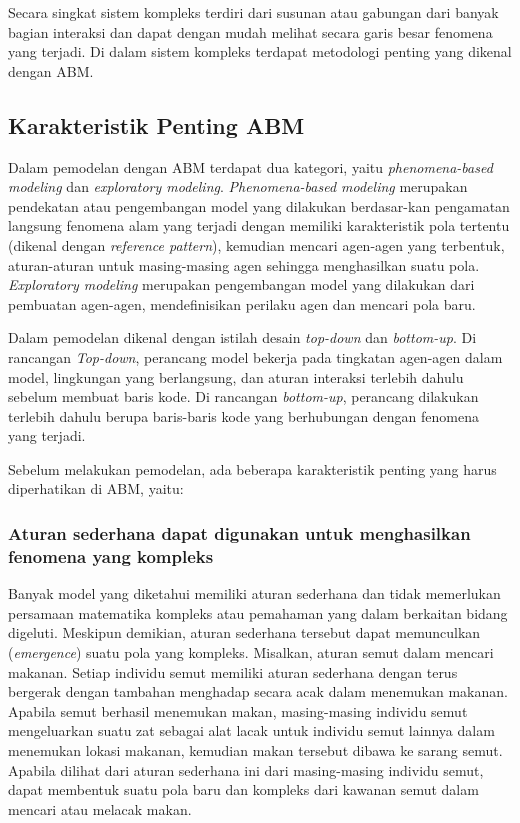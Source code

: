 Secara singkat sistem kompleks terdiri dari susunan atau gabungan dari banyak bagian interaksi dan dapat dengan mudah melihat secara garis besar fenomena yang terjadi. Di dalam sistem kompleks terdapat metodologi penting yang dikenal dengan ABM.

\subsection{Karakteristik Penting ABM}

Dalam pemodelan dengan ABM terdapat dua kategori, yaitu \textit{phenomena-based modeling} dan \textit{exploratory modeling}. \textit{Phenomena-based modeling} merupakan pendekatan atau pengembangan model yang dilakukan berdasar-kan pengamatan langsung fenomena alam yang terjadi dengan memiliki karakteristik pola tertentu (dikenal dengan \textit{reference pattern}), kemudian mencari agen-agen yang terbentuk, aturan-aturan untuk masing-masing agen sehingga menghasilkan suatu pola. \textit{Exploratory modeling} merupakan pengembangan model yang dilakukan dari pembuatan agen-agen, mendefinisikan perilaku agen dan mencari pola baru.

Dalam pemodelan dikenal dengan istilah desain \textit{top-down} dan \textit{bottom-up}. Di rancangan \textit{Top-down}, perancang model bekerja pada tingkatan agen-agen dalam model, lingkungan yang berlangsung, dan aturan interaksi terlebih dahulu sebelum membuat baris kode. Di rancangan \textit{bottom-up}, perancang dilakukan terlebih dahulu berupa baris-baris kode yang berhubungan dengan fenomena yang terjadi.

Sebelum melakukan pemodelan, ada beberapa karakteristik penting yang harus diperhatikan di ABM, yaitu:

\subsubsection*{Aturan sederhana dapat digunakan untuk menghasilkan fenomena yang kompleks}

Banyak model yang diketahui memiliki aturan sederhana dan tidak memerlukan persamaan matematika kompleks atau pemahaman yang dalam berkaitan bidang digeluti. Meskipun demikian, aturan sederhana tersebut dapat memunculkan (\textit{emergence}) suatu pola yang kompleks. Misalkan, aturan semut dalam mencari makanan. Setiap individu semut memiliki aturan sederhana dengan terus bergerak dengan tambahan menghadap secara acak dalam menemukan makanan. Apabila semut berhasil menemukan makan, masing-masing individu semut mengeluarkan suatu zat sebagai alat lacak untuk individu semut lainnya dalam menemukan lokasi makanan, kemudian makan tersebut dibawa ke sarang semut. Apabila dilihat dari aturan sederhana ini dari masing-masing individu semut, dapat membentuk suatu pola baru dan kompleks dari kawanan semut dalam mencari atau melacak makan.

